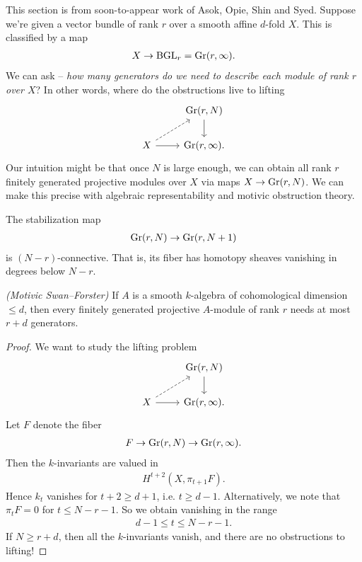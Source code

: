 \documentclass[11pt,openany]{book}
\begin{document}
This section is from soon-to-appear work of Asok, Opie, Shin and Syed. Suppose we're given a vector bundle of rank $r$ over a smooth affine $d$-fold $X$. This is classified by a map
\begin{align*}
    X \to \mathrm{BGL}_r = \mathrm{Gr}(r,\infty).
\end{align*}
%
We can ask -- \textit{how many generators do we need to describe each module of rank $r$ over $X$}? In other words, where do the obstructions live to lifting
\[ \begin{tikzcd}
     & {\Gr(r,N)}\dar\\
    X\rar\ar[ur,dashed] & {\Gr(r,\infty)}.
\end{tikzcd} \]
%
Our intuition might be that once $N$ is large enough, we can obtain all rank $r$ finitely generated projective modules over $X$ via maps $X \to \mathrm{Gr}(r,N)$. We can make this precise with algebraic representability and motivic obstruction theory.

\begin{proposition} The stabilization map
\begin{align*}
    \mathrm{Gr}(r,N) \to \mathrm{Gr}(r,N+1)
\end{align*}
is $(N-r)$-connective. That is, its fiber has homotopy sheaves vanishing in degrees below $N-r$.
\end{proposition}

\begin{theorem}\label{thm:motivic-Swan-Forster} 
\textit{(Motivic Swan--Forster)} If $A$ is a smooth $k$-algebra of cohomological dimension $\le d$, then every finitely generated projective $A$-module of rank $r$ needs at most $r+d$ generators.
\end{theorem}
\begin{proof} We want to study the lifting problem
\[ \begin{tikzcd}
     & {\Gr(r,N)}\dar\\
    X\rar\ar[ur,dashed] & {\Gr(r,\infty).}
\end{tikzcd} \]
Let $F$ denote the fiber
\begin{align*}
    F \to \mathrm{Gr}(r,N) \to \mathrm{Gr}(r,\infty).
\end{align*}
Then the $k$-invariants are valued in
\begin{align*}
    H^{t+2}(X, \pi_{t+1}F).
\end{align*}
Hence $k_t$ vanishes for $t+2 \ge d+1$, i.e. $t\ge d-1$. Alternatively, we note that $\pi_t F = 0$ for $t \le N-r-1$. So we obtain vanishing in the range
\begin{align*}
    d-1 \le t \le N-r-1.
\end{align*}
If $N \ge r+d$, then all the $k$-invariants vanish, and there are no obstructions to lifting!
\end{proof}
\end{document}
